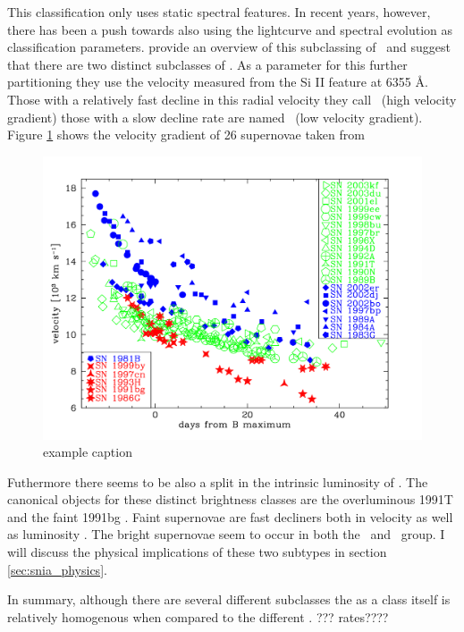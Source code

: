 This classification only uses static spectral features. In recent years, however, there has been a push towards also using the lightcurve and spectral evolution as classification parameters. \citet{2005ApJ...623.1011B} provide an overview of this subclassing of \sneia\ and suggest that there are two distinct subclasses of \sneia. As a parameter for this further partitioning they use the velocity measured from the Si II feature at 6355 \AA. Those with a relatively fast decline in this radial velocity they call \hvg\ (high velocity gradient) those with a slow decline rate are named \lvg\ (low velocity gradient). 
Figure \ref{fig:sn_class_lvg_hvg} shows the velocity gradient of 26 supernovae taken from  \citet{2005ApJ...623.1011B}

\begin{figure}[htbp] %
   \centering
   \includegraphics[width=\textwidth]{chapter1/plots/velocity_gradient.pdf} 
   \caption{example caption}
   \label{fig:sn_class_lvg_hvg}
\end{figure}

Futhermore there seems to be also a split in the intrinsic luminosity of \sneia. The canonical objects for these distinct brightness classes are the overluminous 1991T \citet{1992AJ....103.1632P} and the faint 1991bg .
Faint supernovae are fast decliners both in velocity as well as luminosity \citet{2005ApJ...623.1011B}. The bright supernovae seem to occur in both the \hvg\ and \lvg\ group. I will discuss the physical implications of these two subtypes in section \ref{sec:snia_physics}.

In summary, although there are several different subclasses the \snia as a class itself is relatively homogenous when compared to the different \sneii. ??? rates????

